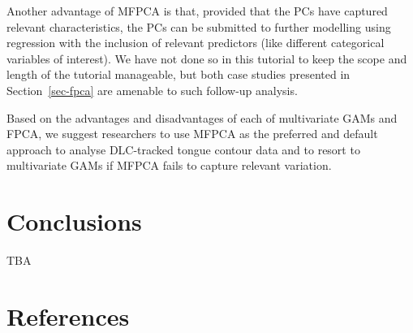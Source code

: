 \documentclass[
]{interact}
\begin{document}
Another advantage of MFPCA is that, provided that the PCs have captured
relevant characteristics, the PCs can be submitted to further modelling
using regression with the inclusion of relevant predictors (like
different categorical variables of interest). We have not done so in
this tutorial to keep the scope and length of the tutorial manageable,
but both case studies presented in Section~\ref{sec-fpca} are amenable
to such follow-up analysis.

Based on the advantages and disadvantages of each of multivariate GAMs
and FPCA, we suggest researchers to use MFPCA as the preferred and
default approach to analyse DLC-tracked tongue contour data and to
resort to multivariate GAMs if MFPCA fails to capture relevant
variation.

\section{Conclusions}\label{conclusions}

TBA

\section{References}\label{references}
\end{document}
